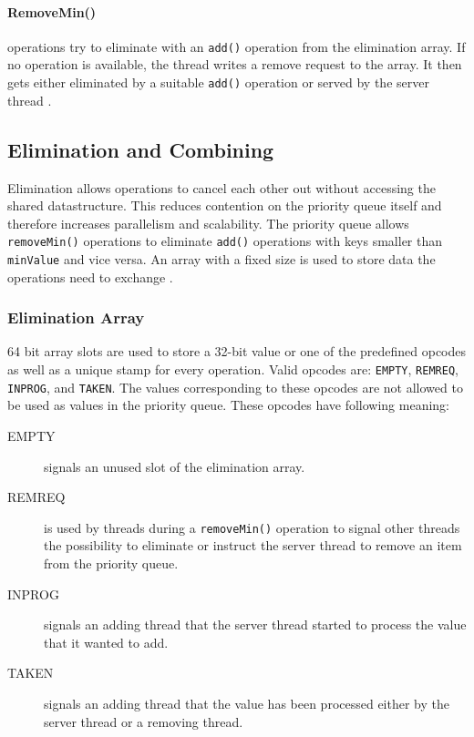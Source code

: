 \paragraph{RemoveMin()}

operations try to eliminate with an \texttt{add()} operation from the elimination array. If no operation is available, the thread writes a remove request to the array. It then gets either eliminated by a suitable \texttt{add()} operation or served by the server thread \cite{calciu_adaptive_2014}.

\subsection{Elimination and Combining}

Elimination allows operations to cancel each other out without accessing the shared datastructure. This reduces contention on the priority queue itself and therefore increases parallelism and scalability. The priority queue allows \texttt{removeMin()} operations to eliminate \texttt{add()} operations with keys smaller than \texttt{minValue} and vice versa. An array with a fixed size is used to store data the operations need to exchange \cite{calciu_adaptive_2014}.

\subsubsection{Elimination Array}
\label{sec:eliminationArray}

64 bit array slots are used to store a 32-bit value or one of the predefined opcodes as well as a unique stamp for every operation. Valid opcodes are: \texttt{EMPTY}, \texttt{REMREQ}, \texttt{INPROG}, and \texttt{TAKEN}. The values corresponding to these opcodes are not allowed to be used as values in the priority queue. These opcodes have following meaning:

\begin{description}
	\item[EMPTY] signals an unused slot of the elimination array.
	\item[REMREQ] is used by threads during a \texttt{removeMin()} operation to signal other threads the possibility to eliminate or instruct the server thread to remove an item from the priority queue.
	\item[INPROG] signals an adding thread that the server thread started to process the value that it wanted to add.
	\item[TAKEN] signals an adding thread that the value has been processed either by the server thread or a removing thread.
\end{description}

